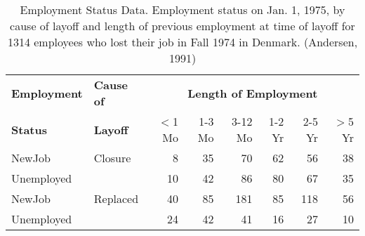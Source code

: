 \begin{table}[htb]
 \caption[Employment Status Data]{Employment Status Data. Employment status on Jan. 1, 1975, by cause of layoff and length of
    previous employment at time of layoff for 1314 employees who lost their
    job in Fall 1974 in Denmark. (Andersen, 1991)}\vspace{5pt}
 \label{tab:employ}
 \begin{center}
  \begin{tabular}{|ll|rrrrrr|}
   \hline
{\bfseries\large Employment} & {\bfseries\large Cause of} & \multicolumn{6}{c|}{\bfseries\large Length of Employment}\rule{0in}{2.5ex}\\
{\bfseries\large Status} & {\bfseries\large Layoff} & $<$1 Mo      & 1-3 Mo     & 3-12 Mo    & 1-2 Yr     & 2-5 Yr     & $>$5 Yr      \\
   \hline
NewJob       & Closure    &    8 &   35 &   70 &   62 &   56 &   38 \\
Unemployed   &            &   10 &   42 &   86 &   80 &   67 &   35 \\
[4pt]
NewJob       & Replaced   &   40 &   85 &  181 &   85 &  118 &   56 \\
Unemployed   &            &   24 &   42 &   41 &   16 &   27 &   10 \\
   \hline
  \end{tabular}
 \end{center}
\end{table}
